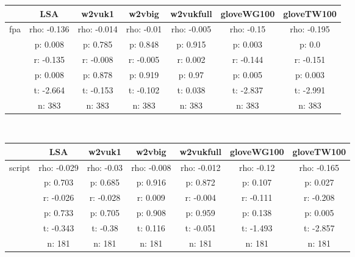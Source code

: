 \documentclass{article}
\begin{document}
\begin{tabular}{ccccccc|}\cline{2-7}
&\multicolumn{1}{|c}{LSA} & w2vuk1 & w2vbig & w2vukfull & gloveWG100 & gloveTW100 \\\hline
\multicolumn{1}{|c|}{\multirow{6}{*}{fpa}} & rho: -0.136 & rho: -0.014 & rho: -0.01 & rho: -0.005 & rho: -0.15 & rho: -0.195 \\
\multicolumn{1}{|c|}{} & p: 0.008 & p: 0.785 & p: 0.848 & p: 0.915 & p: 0.003 & p: 0.0 \\
\multicolumn{1}{|c|}{} & r: -0.135 & r: -0.008 & r: -0.005 & r: 0.002 & r: -0.144 & r: -0.151 \\
\multicolumn{1}{|c|}{} & p: 0.008 & p: 0.878 & p: 0.919 & p: 0.97 & p: 0.005 & p: 0.003 \\
\multicolumn{1}{|c|}{} & t: -2.664 & t: -0.153 & t: -0.102 & t: 0.038 & t: -2.837 & t: -2.991 \\
\multicolumn{1}{|c|}{} & n: 383 & n: 383 & n: 383 & n: 383 & n: 383 & n: 383 \\
\hline
\end{tabular}\\
\begin{tabular}{ccccccc|}\cline{2-7}
&\multicolumn{1}{|c}{LSA} & w2vuk1 & w2vbig & w2vukfull & gloveWG100 & gloveTW100 \\\hline
\multicolumn{1}{|c|}{\multirow{6}{*}{script}} & rho: -0.029 & rho: -0.03 & rho: -0.008 & rho: -0.012 & rho: -0.12 & rho: -0.165 \\
\multicolumn{1}{|c|}{} & p: 0.703 & p: 0.685 & p: 0.916 & p: 0.872 & p: 0.107 & p: 0.027 \\
\multicolumn{1}{|c|}{} & r: -0.026 & r: -0.028 & r: 0.009 & r: -0.004 & r: -0.111 & r: -0.208 \\
\multicolumn{1}{|c|}{} & p: 0.733 & p: 0.705 & p: 0.908 & p: 0.959 & p: 0.138 & p: 0.005 \\
\multicolumn{1}{|c|}{} & t: -0.343 & t: -0.38 & t: 0.116 & t: -0.051 & t: -1.493 & t: -2.857 \\
\multicolumn{1}{|c|}{} & n: 181 & n: 181 & n: 181 & n: 181 & n: 181 & n: 181 \\
\hline
\end{tabular}\\
\end{document}
